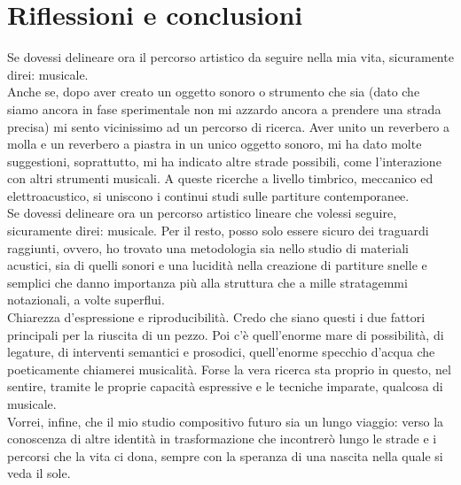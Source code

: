 
\chapter{Riflessioni e conclusioni}
\label{chp:Riflessioni e conclusioni}

Se dovessi delineare ora il percorso artistico da seguire nella mia vita, sicuramente direi: musicale. \\
Anche se, dopo aver creato un oggetto sonoro o strumento che sia (dato che siamo ancora in fase sperimentale non mi azzardo ancora a prendere una strada precisa) mi sento vicinissimo ad un percorso di ricerca.
Aver unito un reverbero a molla e un reverbero a piastra in un unico oggetto sonoro, mi ha dato molte suggestioni, soprattutto, mi ha indicato altre strade possibili, come l'interazione con altri strumenti musicali. A queste ricerche a livello timbrico, meccanico ed elettroacustico, si uniscono i continui studi sulle partiture contemporanee. \\
Se dovessi delineare ora un percorso artistico lineare che volessi seguire, sicuramente direi: musicale. Per il resto, posso solo essere sicuro dei traguardi raggiunti, ovvero, ho trovato una metodologia sia nello studio di materiali acustici, sia di quelli sonori e una lucidità nella creazione di partiture snelle e semplici che danno importanza più alla struttura che a mille stratagemmi notazionali, a volte superflui. \\
Chiarezza d'espressione e riproducibilità. Credo che siano questi i due fattori principali per la riuscita di un pezzo. Poi c'è quell'enorme mare di possibilità, di legature, di interventi semantici e prosodici, quell'enorme specchio d'acqua che poeticamente chiamerei musicalità. Forse la vera ricerca sta proprio in questo, nel sentire, tramite le proprie capacità espressive e le tecniche imparate, qualcosa di musicale. \\
Vorrei, infine, che il mio studio compositivo futuro sia un lungo viaggio: verso la conoscenza di altre identità in trasformazione che incontrerò lungo le strade e i percorsi che la vita ci dona, sempre con la speranza di una nascita nella quale si veda il sole.
